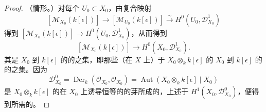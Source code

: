 \begin{proof}
（情形。）对每个 $U_0\subset X_0$，由复合映射
\[
[\mathcal M_{X_0}(k[\epsilon])]\longrightarrow[\mathcal M_{U_0}(k[\epsilon])]
\xrightarrow\sim H^0(U_0,\mathcal D^1_{X_0})
\]
得到 $[\mathcal M_{X_0}(k[\epsilon])]\to H^0(U_0,\mathcal D^1_{X_0})$，从而得到
\[
[\mathcal M_{X_0}(k[\epsilon])]\longrightarrow H^0(X_0,\mathcal D^1_{X_0}).
\]
其是 $X_0$ 到 $k[\epsilon]$ 的的之集，即那些（在 $X$ 上）于 $X_0\otimes_k k[\epsilon]$ 的 $X_0$ 到 $k[\epsilon]$ 的的之集。因为
\[
\mathcal D^0_{X_0}=\operatorname{Der}_k(\mathcal O_{X_0},\mathcal O_{X_0})
=\operatorname{Aut}(X_0\otimes_k k[\epsilon]\mid X_0)
\]
是 $X_0\otimes_k k[\epsilon]$ 的在 $X_0$ 上诱导恒等的的芽所成的，上述于 $H^1(X_0,\mathcal D^0_{X_0})$，便得到所需的。
\end{proof}

